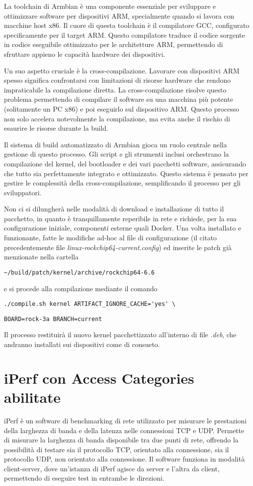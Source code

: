 La toolchain di Armbian è una componente essenziale per sviluppare e ottimizzare software per dispositivi ARM, specialmente quando si lavora con macchine host x86. Il cuore di questa toolchain è il compilatore GCC, configurato specificamente per il target ARM. Questo compilatore traduce il codice sorgente in codice eseguibile ottimizzato per le architetture ARM, permettendo di sfruttare appieno le capacità hardware dei dispositivi.

Un suo aspetto cruciale è la cross-compilazione. Lavorare con dispositivi ARM spesso significa confrontarsi con limitazioni di risorse hardware che rendono impraticabile la compilazione diretta. La cross-compilazione risolve questo problema permettendo di compilare il software su una macchina più potente (solitamente un PC x86) e poi eseguirlo sul dispositivo ARM. Questo processo non solo accelera notevolmente la compilazione, ma evita anche il rischio di esaurire le risorse durante la build.

Il sistema di build automatizzato di Armbian gioca un ruolo centrale nella gestione di questo processo. Gli script e gli strumenti inclusi orchestrano la compilazione del kernel, del bootloader e dei vari pacchetti software, assicurando che tutto sia perfettamente integrato e ottimizzato. Questo sistema è pensato per gestire le complessità della cross-compilazione, semplificando il processo per gli sviluppatori.

Non ci si dilungherà nelle modalità di download e installazione di tutto il pacchetto, in quanto è tranquillamente reperibile in rete e richiede, per la sua configurazione iniziale, componenti esterne quali Docker. Una volta installato e funzionante, fatte le modifiche ad-hoc al file di configurazione (il citato precedentemente file \textit{linux-rockchip64-current.config}) ed inserite le patch già menzionate nella cartella

\verb|~/build/patch/kernel/archive/rockchip64-6.6 |

\noindent e si procede alla compilazione mediante il comando 

\verb|./compile.sh kernel ARTIFACT_IGNORE_CACHE='yes' \| 

\verb|BOARD=rock-3a BRANCH=current|

\noindent Il processo restituirà il nuovo kernel pacchettizzato all'interno di file \textit{.deb}, che andranno installati sui dispositivi come di consueto.

\section{iPerf con Access Categories abilitate}
iPerf è un software di benchmarking di rete utilizzato per misurare le prestazioni della larghezza di banda e della latenza nelle connessioni TCP e UDP. Permette di misurare la larghezza di banda disponibile tra due punti di rete, offrendo la possibilità di testare sia il protocollo TCP, orientato alla connessione, sia il protocollo UDP, non orientato alla connessione. Il software funziona in modalità client-server, dove un'istanza di iPerf agisce da server e l'altra da client, permettendo di eseguire test in entrambe le direzioni.

